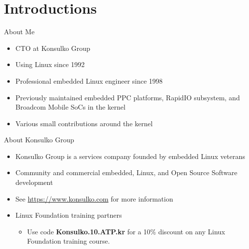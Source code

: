 \section{Introductions}

\begin{frame}
	{About Me}

	\begin{itemize}
		\item
			CTO at Konsulko Group
		\item
			Using Linux since 1992
		\item
			Professional embedded Linux engineer since 1998
		\item
			Previously maintained embedded PPC platforms, RapidIO subsystem, and Broadcom Mobile SoCs in the kernel
		\item
			Various small contributions around the kernel
	\end{itemize}

\end{frame}


\begin{frame}
	{About Konsulko Group}
	\begin{itemize}
		\item
			Konsulko Group is a services company founded by embedded Linux veterans
		\item
			Community and commercial embedded, Linux, and Open Source Software development
		\item
			See \url{https://www.konsulko.com} for more information
		\item
			Linux Foundation training partners
			\begin{itemize}
				\item
					Use code \textbf{Konsulko.10.ATP.kr} for a 10\% discount on any Linux Foundation training course.
			\end{itemize}
	\end{itemize}
\end{frame}
